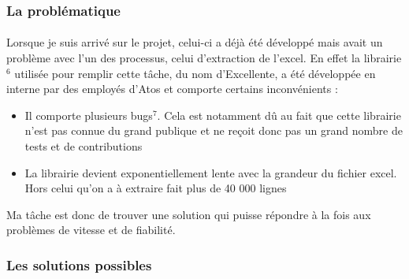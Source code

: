 \documentclass[12pt]{article}
\begin{document}
\begin {sloppypar}
\subsubsection{La problématique}
\paragraph {}
Lorsque je suis arrivé sur le projet, celui-ci a déjà été développé mais avait un 
problème avec l'un des processus, celui d'extraction de l'excel. En effet la librairie$^{6}$
utilisée pour remplir cette tâche, du nom d'Excellente, a été développée en interne par des 
employés d'Atos et comporte certains inconvénients : 
\begin{itemize}
  \item 
    Il comporte plusieurs bugs$^{7}$. Cela est notamment dû au fait que cette librairie 
    n'est pas connue du grand publique et ne reçoit donc pas un grand nombre de tests et 
    de contributions 
  \item 
    La librairie devient exponentiellement lente avec la grandeur du fichier excel. Hors
    celui qu'on a à extraire fait plus de 40 000 lignes
\end{itemize}
Ma tâche est donc de trouver une solution qui puisse répondre à la fois aux problèmes
de vitesse et de fiabilité.
\newpage
\subsubsection{Les solutions possibles}

\end{sloppypar}
\end{document}
